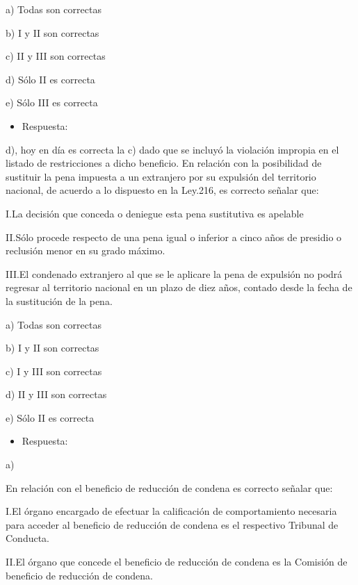 \documentclass[letterpaper, 11pt]{article}
\begin{document}
a) Todas son correctas

b) I y II son correctas

c) II y III son correctas

d) Sólo II es correcta

e) Sólo III es correcta


\begin{itemize}
\item Respuesta:
\end{itemize}

d), hoy en día es correcta la c) dado que se incluyó la violación
impropia en el listado de restricciones a dicho beneficio. En relación
con la posibilidad de sustituir la pena impuesta a un extranjero por
su expulsión del territorio nacional, de acuerdo a lo dispuesto en la
Ley.216, es correcto señalar que:



I.La decisión que conceda o deniegue esta pena sustitutiva es apelable



II.Sólo procede respecto de una pena igual o inferior a cinco años de
presidio o reclusión menor en su grado máximo.



III.El condenado extranjero al que se le aplicare la pena de expulsión
no podrá regresar al territorio nacional en un plazo de diez años, contado
desde la fecha de la sustitución de la pena.





a) Todas son correctas

b) I y II son correctas

c) I y III son correctas

d) II y III son correctas

e) Sólo II es correcta


\begin{itemize}
\item Respuesta:
\end{itemize}

a)



En relación con el beneficio de reducción de condena es correcto
señalar que:


I.El órgano encargado de efectuar la calificación de comportamiento
necesaria para acceder al beneficio de reducción de condena es el
respectivo Tribunal de Conducta.



II.El órgano que concede el beneficio de reducción de condena es la
Comisión de beneficio de reducción de condena.
\end{document}
